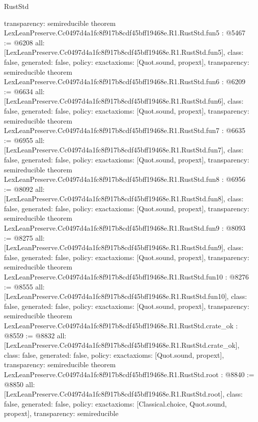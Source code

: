 \begin{lexlean}{RustStd}
\begin{coremodule}
{  transparency: semireducible
}
theorem LexLeanPreserve.Cc0497d4a1fc8f917b8cdf45bff19468e.R1.RustStd.fun5 : @5467 := @6208 {
  all: [LexLeanPreserve.Cc0497d4a1fc8f917b8cdf45bff19468e.R1.RustStd.fun5],
  class: false,
  generated: false,
  policy: exact{axioms: [Quot.sound, propext]},
  transparency: semireducible
}
theorem LexLeanPreserve.Cc0497d4a1fc8f917b8cdf45bff19468e.R1.RustStd.fun6 : @6209 := @6634 {
  all: [LexLeanPreserve.Cc0497d4a1fc8f917b8cdf45bff19468e.R1.RustStd.fun6],
  class: false,
  generated: false,
  policy: exact{axioms: [Quot.sound, propext]},
  transparency: semireducible
}
theorem LexLeanPreserve.Cc0497d4a1fc8f917b8cdf45bff19468e.R1.RustStd.fun7 : @6635 := @6955 {
  all: [LexLeanPreserve.Cc0497d4a1fc8f917b8cdf45bff19468e.R1.RustStd.fun7],
  class: false,
  generated: false,
  policy: exact{axioms: [Quot.sound, propext]},
  transparency: semireducible
}
theorem LexLeanPreserve.Cc0497d4a1fc8f917b8cdf45bff19468e.R1.RustStd.fun8 : @6956 := @8092 {
  all: [LexLeanPreserve.Cc0497d4a1fc8f917b8cdf45bff19468e.R1.RustStd.fun8],
  class: false,
  generated: false,
  policy: exact{axioms: [Quot.sound, propext]},
  transparency: semireducible
}
theorem LexLeanPreserve.Cc0497d4a1fc8f917b8cdf45bff19468e.R1.RustStd.fun9 : @8093 := @8275 {
  all: [LexLeanPreserve.Cc0497d4a1fc8f917b8cdf45bff19468e.R1.RustStd.fun9],
  class: false,
  generated: false,
  policy: exact{axioms: [Quot.sound, propext]},
  transparency: semireducible
}
theorem LexLeanPreserve.Cc0497d4a1fc8f917b8cdf45bff19468e.R1.RustStd.fun10 : @8276 := @8555 {
  all: [LexLeanPreserve.Cc0497d4a1fc8f917b8cdf45bff19468e.R1.RustStd.fun10],
  class: false,
  generated: false,
  policy: exact{axioms: [Quot.sound, propext]},
  transparency: semireducible
}
theorem LexLeanPreserve.Cc0497d4a1fc8f917b8cdf45bff19468e.R1.RustStd.crate_ok : @8559 := @8832 {
  all: [LexLeanPreserve.Cc0497d4a1fc8f917b8cdf45bff19468e.R1.RustStd.crate_ok],
  class: false,
  generated: false,
  policy: exact{axioms: [Quot.sound, propext]},
  transparency: semireducible
}
theorem LexLeanPreserve.Cc0497d4a1fc8f917b8cdf45bff19468e.R1.RustStd.root : @8840 := @8850 {
  all: [LexLeanPreserve.Cc0497d4a1fc8f917b8cdf45bff19468e.R1.RustStd.root],
  class: false,
  generated: false,
  policy: exact{axioms: [Classical.choice, Quot.sound, propext]},
  transparency: semireducible
}


\end{coremodule}
\end{lexlean}
